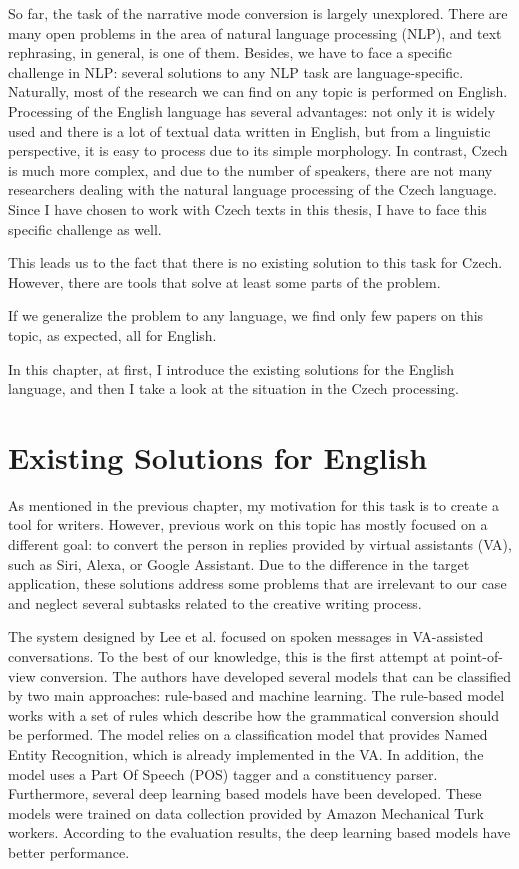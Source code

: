 So far, the task of the narrative mode conversion is largely unexplored. There are many open problems in the area of natural language processing (NLP), and text rephrasing, in general, is one of them. Besides, we have to face a specific challenge in NLP: several solutions to any NLP task are language-specific. Naturally, most of the research we can find on any topic is performed on English. Processing of the English language has several advantages: not only it is widely used and there is a lot of textual data written in English, but from a linguistic perspective, it is easy to process due to its simple morphology. In contrast, Czech is much more complex, and due to the number of speakers, there are not many researchers dealing with the natural language processing of the Czech language. Since I have chosen to work with Czech texts in this thesis, I have to face this specific challenge as well.

This leads us to the fact that there is no existing solution to this task for Czech. However, there are tools that solve at least some parts of the problem.

If we generalize the problem to any language, we find only few papers on this topic, as expected, all for English.

In this chapter, at first, I introduce the existing solutions for the English language, and then I take a look at the situation in the Czech processing.

\section{Existing Solutions for English}

As mentioned in the previous chapter, my motivation for this task is to create a tool for writers. However, previous work on this topic has mostly focused on a different goal: to convert the person in replies provided by virtual assistants (VA), such as Siri, Alexa, or Google Assistant. Due to the difference in the target application, these solutions address some problems that are irrelevant to our case and neglect several subtasks related to the creative writing process.

The system designed by Lee et al. \cite{lee2020converting} focused on spoken messages in VA-assisted conversations. To the best of our knowledge, this is the first attempt at point-of-view conversion. The authors have developed several models that can be classified by two main approaches: rule-based and machine learning. The rule-based model works with a set of rules which describe how the grammatical conversion should be performed. The model relies on a classification model that provides Named Entity Recognition, which is already implemented in the VA. In addition, the model uses a Part Of Speech (POS) tagger and a constituency parser. Furthermore, several deep learning based models have been developed. These models were trained on data collection provided by Amazon Mechanical Turk workers. According to the evaluation results, the deep learning based models have better performance.

